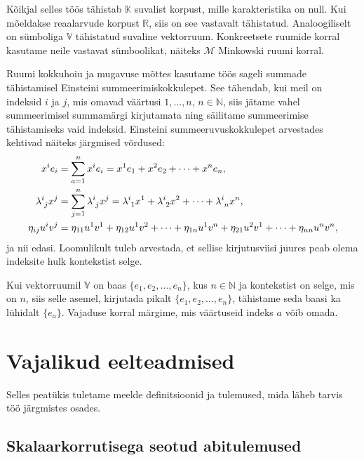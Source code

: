 \documentclass[12pt,a4paper,oneside]{article}
\theoremstyle{plain}
\theoremstyle{definition}
\numberwithin{equation}{section}
\def\N{{\mathbb N}}
\def\R{{\mathbb R}}
\def\K{{\mathbb K}}
\def\V{{\mathbb V}}
\def\M{{\mathcal M}}
\begin{document}
Kõikjal selles töös tähistab $\K$ suvalist korpust, mille
karakteristika on null. Kui mõeldakse reaalarvude korpust 
$\R$, siis on see vastavalt tähistatud. Analoogiliselt on 
sümboliga $\V$ tähistatud suvaline vektorruum. Konkreetsete 
ruumide korral kasutame neile vastavat süm\-boolikat, näiteks 
$\M$ Minkowski ruumi korral.

Ruumi kokkuhoiu ja mugavuse mõttes kasutame töös sageli 
summade tähista\-misel Einsteini summeerimiskokkulepet. 
See tähendab, kui meil on indeksid $i$ 
ja $j$, mis omavad väärtusi $1, \dots, n$, $n \in \N$, siis 
jätame vahel summeerimisel summamärgi kirjutamata 
ning säilitame summeerimise tähistamiseks vaid indeksid. 
Einsteini summeeruvuskokkulepet arvestades kehtivad näiteks 
järgmised võrdused:
\begin{align*}
x^{i} e_{i} &= \sum_{a=1}^{n} x^{i} e_{i} = 
	x^{1} e_{1} + x^{2} e_{2} + \dots + x^{n} e_{n}, \\
\lambda\indices{^i_j} x^{j} &= \sum_{j=1}^{n} 
	\lambda\indices{^i_j} x^{j} = \lambda\indices{^i_1} x^{1} + 
	\lambda\indices{^i_2} x^{2} + 
	\dots +\lambda\indices{^i_n} x^{n},\\
\eta_{ij} u^{i} v^{j} &= \eta_{11} u^{1} v^{1} + 
	\eta_{12} u^{1} v^{2} + \dots + \eta_{1n} u^{1} v^{n} + 
	\eta_{21} u^{2} v^{1} + \dots + \eta_{nn} u^{n} v^{n},
\end{align*}
ja nii edasi. Loomulikult tuleb arvestada, et sellise 
kirjutusviisi juures peab olema indeksite hulk kontekstist 
selge.

Kui vektorruumil $\V$ on baas $\{e_1, e_2, \ldots, e_n\}$, kus 
$n \in \N$ ja kontekstist on selge, mis on $n$, siis selle 
asemel, kirjutada pikalt $\{e_1, e_2, \ldots, e_n\}$, tähistame 
seda baasi ka lühidalt $\{e_a\}$. Vajaduse korral märgime, mis 
väärtuseid indeks $a$ võib omada.

\newpage
\section{Vajalikud eelteadmised}

Selles peatükis tuletame meelde definitsioonid ja tulemused, mida 
läheb tarvis töö järgmistes osades.

\subsection{Skalaarkorrutisega seotud abitulemused}
\label{eelteadmised:skalaar}
\end{document}

